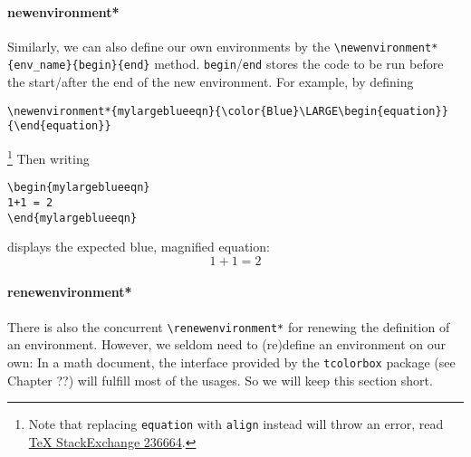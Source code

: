 \paragraph{newenvironment*} Similarly, we can also define our own environments by the \texttt{\textbackslash newenvironment*\{env\_name\}\{begin\}\{end\}} method. \texttt{begin}/\texttt{end} stores the code to be run before the start/after the end of the new environment. For example, by defining
\begin{lstlisting}
\newenvironment*{mylargeblueeqn}{\color{Blue}\LARGE\begin{equation}}{\end{equation}}   
\end{lstlisting}
\newenvironment*{mylargeblueeqn}{\color{Blue}\LARGE\begin{equation}}{\end{equation}}   
\footnote{Note that replacing \texttt{equation} with \texttt{align} instead will throw an error, read \href{https://tex.stackexchange.com/questions/236664/newenvironment-error-with-beginalign-and-endalign}{\TeX{} StackExchange 236664}.} Then writing
\begin{lstlisting}
\begin{mylargeblueeqn}
1+1 = 2
\end{mylargeblueeqn}    
\end{lstlisting}
displays the expected blue, magnified equation:
\begin{mylargeblueeqn}
1+1 = 2
\end{mylargeblueeqn}

\paragraph{renewenvironment*} There is also the concurrent \texttt{\textbackslash renewenvironment*} for renewing the definition of an environment. However, we seldom need to (re)define an environment on our own: In a math document, the interface provided by the \texttt{tcolorbox} package (see Chapter ??) will fulfill most of the usages. So we will keep this section short.